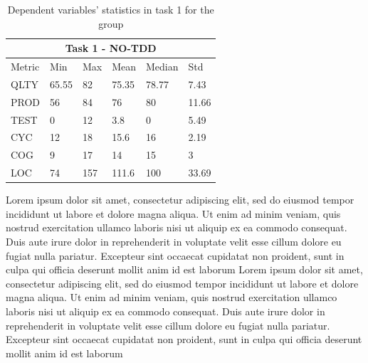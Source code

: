 \begin{table}[!h]
    \begin{center} 
        \begin{tabular}{|p{1.8cm}||p{1.6cm}|p{1.6cm}|p{1.6cm}|p{1.6cm}|p{1.6cm}|}
            \hline
                \multicolumn{6}{|c|}{Task 1 - NO-TDD} \\
            \hline
                Metric & Min & Max & Mean & Median & Std\\
            \hline
                QLTY & 65.55 & 82 & 75.35 & 78.77 & 7.43 \\
                PROD & 56 & 84 & 76 & 80 & 11.66 \\
                TEST & 0 & 12 & 3.8 & 0 & 5.49 \\
                CYC & 12 & 18 & 15.6 & 16 & 2.19 \\
                COG & 9 & 17 & 14 & 15 & 3 \\
                LOC & 74 & 157 & 111.6 & 100 & 33.69 \\
            \hline
        \end{tabular}
        \caption{\label{tab_dv_t1_notdd}Dependent variables' statistics in task 1 for the \notdd group}
    \end{center}
\end{table}



Lorem ipsum dolor sit amet, consectetur adipiscing elit, sed do eiusmod tempor incididunt ut labore et dolore magna aliqua. Ut enim ad minim veniam, quis nostrud exercitation ullamco laboris nisi ut aliquip ex ea commodo consequat. Duis aute irure dolor in reprehenderit in voluptate velit esse cillum dolore eu fugiat nulla pariatur. Excepteur sint occaecat cupidatat non proident, sunt in culpa qui officia deserunt mollit anim id est laborum
Lorem ipsum dolor sit amet, consectetur adipiscing elit, sed do eiusmod tempor incididunt ut labore et dolore magna aliqua. Ut enim ad minim veniam, quis nostrud exercitation ullamco laboris nisi ut aliquip ex ea commodo consequat. Duis aute irure dolor in reprehenderit in voluptate velit esse cillum dolore eu fugiat nulla pariatur. Excepteur sint occaecat cupidatat non proident, sunt in culpa qui officia deserunt mollit anim id est laborum

